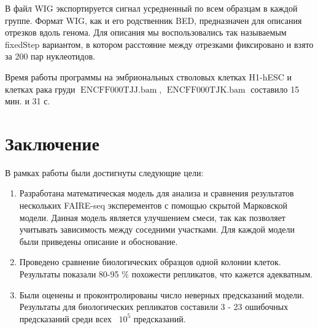 \documentclass{matmex-diploma-custom}
\begin{document}
В файл WIG экспортируется сигнал усредненный по всем образцам в каждой группе.
Формат WIG, как и его родственник BED, предназначен для описания отрезков вдоль генома. Для описания мы воспользовались так называемым fixedStep вариантом, в котором расстояние между отрезками фиксировано и взято за 200 пар нуклеотидов.

Время работы программы на эмбриональных стволовых клетках H1-hESC и клетках рака груди $\operatorname{ENCFF000TJJ.bam}$, $\operatorname{ENCFF000TJK.bam}$ составило 15 мин. и 31 с.%

\section*{Заключение}
В рамках работы были достигнуты следующие цели:
\begin{enumerate}
    \item Разработана математическая модель для анализа и сравнения результатов нескольких FAIRE-seq эксперементов с помощью скрытой Марковской модели. Данная модель является улучшением смеси, так как позволяет учитывать зависимость между соседними участками. Для каждой модели были приведены описание и обоснование.
    \item Проведено сравнение биологических образцов одной колонии клеток. Результаты показали 80-95 $\%$ похожести репликатов, что кажется адекватным.
    \item Были оценены и проконтролированы число неверных предсказаний модели. Результаты для биологических репликатов составили 3 - 23 ошибочных предсказаний среди всех ~$10^5$ предсказаний.
\end{enumerate}
 


\end{document}
